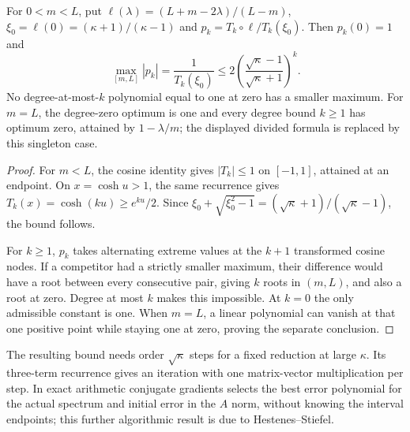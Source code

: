 \begin{theorem}\label{linear:thm:chebyshevaccel}
For $0<m<L$, put $\ell(\lambda)=(L+m-2\lambda)/(L-m)$, $\xi_0=\ell(0)=(\kappa+1)/(\kappa-1)$ and $p_k=T_k\circ\ell/T_k(\xi_0)$. Then $p_k(0)=1$ and
\[\max_{[m,L]}|p_k|=\frac1{T_k(\xi_0)}\le2\left(\frac{\sqrt\kappa-1}{\sqrt\kappa+1}\right)^k.
\]
No degree-at-most-$k$ polynomial equal to one at zero has a smaller maximum. For $m=L$, the degree-zero optimum is one and every degree bound $k\ge1$ has optimum zero, attained by $1-\lambda/m$; the displayed divided formula is replaced by this singleton case.
\end{theorem}
\begin{proof}
For $m<L$, the cosine identity gives $|T_k|\le1$ on $[-1,1]$, attained at an endpoint. On $x=\cosh u>1$, the same recurrence gives $T_k(x)=\cosh(ku)\ge e^{ku}/2$. Since $\xi_0+\sqrt{\xi_0^2-1}=(\sqrt\kappa+1)/(\sqrt\kappa-1)$, the bound follows.

For $k\ge1$, $p_k$ takes alternating extreme values at the $k+1$ transformed cosine nodes. If a competitor had a strictly smaller maximum, their difference would have a root between every consecutive pair, giving $k$ roots in $(m,L)$, and also a root at zero. Degree at most $k$ makes this impossible. At $k=0$ the only admissible constant is one. When $m=L$, a linear polynomial can vanish at that one positive point while staying one at zero, proving the separate conclusion.
\end{proof}

The resulting bound needs order $\sqrt\kappa$ steps for a fixed reduction at large $\kappa$. Its three-term recurrence gives an iteration with one matrix-vector multiplication per step. In exact arithmetic conjugate gradients selects the best error polynomial for the actual spectrum and initial error in the $A$ norm, without knowing the interval endpoints; this further algorithmic result is due to Hestenes--Stiefel.

